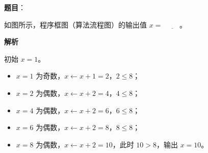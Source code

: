 \begin{answer}

\textbf{题目}：

如图所示，程序框图（算法流程图）的输出值 $x=$ $\underline{\qquad}$。
\nopagebreak[4]
\begin{center}\end{center}
\nopagebreak[4]
\textbf{解析}

初始 $x=1$。

\begin{itemize}
\item $x=1$ 为奇数，$x\leftarrow x+1=2$，$2\leqslant8$；
\item $x=2$ 为偶数，$x\leftarrow x+2=4$，$4\leqslant8$；
\item $x=4$ 为偶数，$x\leftarrow x+2=6$，$6\leqslant8$；
\item $x=6$ 为偶数，$x\leftarrow x+2=8$，$8\leqslant8$；
\item $x=8$ 为偶数，$x\leftarrow x+2=10$，此时 $10>8$，输出 $x=10$。
\end{itemize}


\end{answer}
